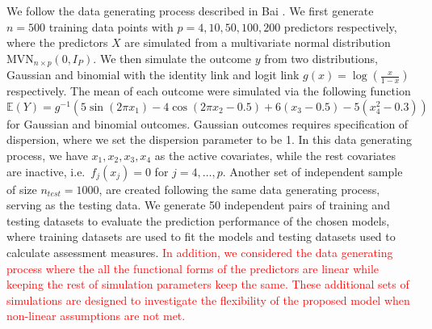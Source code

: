 \documentclass[AMA,STIX1COL,]{WileyNJD-v2}
\begin{document}
We follow the data generating process described in Bai \citep{Bai2021}.
We first generate \(n=500\) training data points with
\(p=4, 10, 50, 100, 200\) predictors respectively, where the predictors
\(X\) are simulated from a multivariate normal distribution
\(\text{MVN}_{n\times p}(0, I_{P})\). We then simulate the outcome \(y\)
from two distributions, Gaussian and binomial with the identity link and
logit link \(g(x) = \log(\frac{x}{1-x})\) respectively. The mean of each
outcome were simulated via the following function \[
\mathbb{E}(Y) = g^{-1}(5 \sin(2\pi x_1) - 4 \cos(2\pi x_2 -0.5) + 6(x_3-0.5) - 5(x_4^2 -0.3))
\] for Gaussian and binomial outcomes. Gaussian outcomes requires
specification of dispersion, where we set the dispersion parameter to be
1. In this data generating process, we have \(x_1, x_2, x_3, x_4\) as
the active covariates, while the rest covariates are inactive,
i.e.~\(f_j(x_j) = 0\) for \(j = 4, \dots, p\). Another set of
independent sample of size \(n_{test}=1000\), are created following the
same data generating process, serving as the testing data. We generate
50 independent pairs of training and testing datasets to evaluate the
prediction performance of the chosen models, where training datasets are
used to fit the models and testing datasets used to calculate assessment
measures.
\textcolor{red}{In addition, we considered the data generating process where the all the functional forms of the predictors are linear while keeping the rest of simulation parameters keep the same. These additional sets of simulations are designed to investigate the flexibility of the proposed model when non-linear assumptions are not met.}
\end{document}
